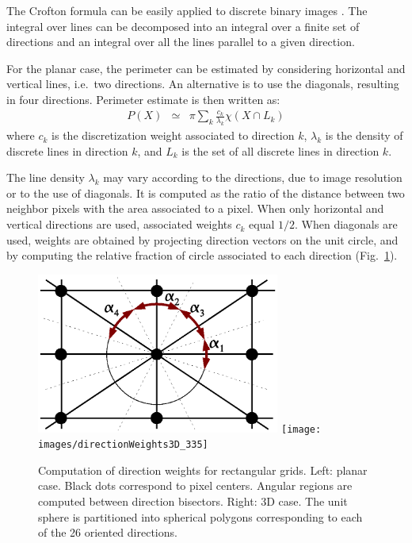\documentclass{InsightArticle}
\begin{document}
The Crofton formula can be easily applied to discrete binary images \cite{Lang2001, Legland2007}. 
The integral over lines can be decomposed into an integral over a finite set of directions
and an integral over all the lines parallel to a given direction. 

For the planar case, the perimeter can be estimated by considering horizontal and vertical lines, 
i.e.\ two directions. An alternative is to use the diagonals, resulting in four directions. 
Perimeter estimate is then written as:
\begin{eqnarray}
P(X) & \simeq & \pi \sum_{k}\frac{c_{k}}{\lambda_{k}}\chi \left( X \cap L_{k} \right)
\end{eqnarray}
where $c_k$ is the discretization weight associated to direction $k$, 
$\lambda_k$ is the density of discrete lines in direction $k$, 
and $L_k$ is the set of all discrete lines in direction $k$.

The line density $\lambda_k$ may vary according to the directions, 
due to image resolution or to the use of diagonals. 
It is computed as the ratio of the distance between two neighbor pixels with
the area associated to a pixel.
When only horizontal and vertical directions are used, associated weights $c_k$ equal $1/2$.
When diagonals are used, weights are obtained by projecting direction vectors on the unit circle, 
and by computing the relative fraction of circle associated to each direction 
(Fig.~\ref{fig:DirectionWeights2D3D}).

\begin{figure}[!htb]
\begin{center}
\includegraphics[width=8cm]{images/directionWeights2D}
\texttt{[image: images/directionWeights3D\_335]}
\end{center}
\caption{Computation of direction weights for rectangular grids. 
Left: planar case. Black dots correspond to pixel centers. 
Angular regions are computed between direction bisectors.
Right: 3D case. The unit sphere is partitioned into spherical polygons
corresponding to each of the 26 oriented directions.
}
\label{fig:DirectionWeights2D3D}
\end{figure}
\end{document}
